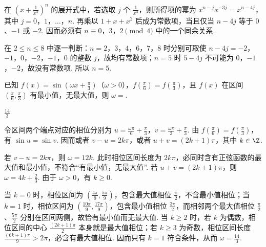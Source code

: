 \begin{solution}
在 \(\left(x+\frac{1}{x^3}\right)^n\) 的展开式中，若选取 \(j\) 个 \(\frac{1}{x^3}\)，则所得项的幂为
\(x^{n-j}x^{-3j}=x^{n-4j}\)，其中 \(j=0\)，\(1\)，\(\ldots\)，\(n\). 再乘以 \(1+x+x^2\) 后成为常数项，当且仅当 \(n-4j\) 等于 \(0\)、\(-1\) 或 \(-2\). 因而必须有 \(n\equiv0\)，\(3\)，\(2\pmod4\) 中的一个同余关系.

在 \(2\leqslant n\leqslant8\) 中逐一判断：\(n=2\)，\(3\)，\(4\)，\(6\)，\(7\)，\(8\) 时分别可取使 \(n-4j=-2\)，\(-1\)，\(0\)，\(-2\)，\(-1\)，\(0\) 的整数 \(j\)，故均有常数项；\(n=5\) 时 \(5-4j\) 不可能为 \(0\)，\(-1\)，\(-2\)，故没有常数项. 所以 \(n=5\).
\end{solution}

\begin{problem}
已知 \(f(x) = \sin \left( \omega x + \frac{\pi}{3} \right)\)（\(\omega > 0\)），\( f\left(\frac{\pi}{6}\right) = f\left(\frac{\pi}{3}\right) \)，且 \( f(x) \) 在区间 \( \left(\frac{\pi}{6}, \frac{\pi}{3}\right) \) 有最小值，无最大值，则 \( \omega = \)\fillinblank{}.
\end{problem}

\begin{answer}
\(\frac{14}{3}\)
\end{answer}

\begin{solution}
令区间两个端点对应的相位分别为
\(u=\frac{\omega\pi}{6}+\frac{\pi}{3}\)，\(v=\frac{\omega\pi}{3}+\frac{\pi}{3}\). 由 \(f(\frac{\pi}{6})=f(\frac{\pi}{3})\)，有 \(\sin u=\sin v\). 因而或者 \(v-u=2k\pi\)，或者 \(u+v=(2k+1)\pi\)，其中 \(k\in\Z\).

若 \(v-u=2k\pi\)，则 \(\omega=12k\). 此时相位区间长度为 \(2k\pi\)，必同时含有正弦函数的最大值和最小值，不符合“有最小值，无最大值”. 若 \(u+v=(2k+1)\pi\)，则
\(\omega=4k+\frac{2}{3}\). 由于 \(\omega>0\)，有 \(k\geqslant0\).

当 \(k=0\) 时，相位区间为 \(\left(\frac{4\pi}{9},\frac{5\pi}{9}\right)\)，包含最大值相位 \(\frac{\pi}{2}\)，不含最小值相位；当 \(k=1\) 时，相位区间为 \(\left(\frac{10\pi}{9},\frac{17\pi}{9}\right)\)，包含最小值相位 \(\frac{3\pi}{2}\)，而相邻两个最大值相位 \(\frac{\pi}{2}\)、\(\frac{5\pi}{2}\) 分别在区间两侧，故恰有最小值而无最大值. 当 \(k\geqslant2\) 时，若 \(k\) 为偶数，相位区间的中心 \(\frac{(2k+1)\pi}{2}\) 本身就是最大值相位；若 \(k\geqslant3\) 为奇数，相位区间长度 \(\frac{(6k+1)\pi}{9}>2\pi\)，必含有最大值相位. 因而只有 \(k=1\) 符合条件，从而 \(\omega=\frac{14}{3}\).
\end{solution}

